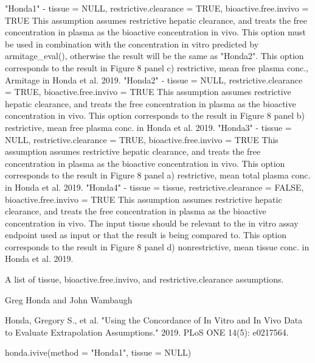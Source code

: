 \documentclass[a4paper]{book}
\begin{document}
%
\begin{Details}\relax
"Honda1" - tissue = NULL, restrictive.clearance = TRUE, bioactive.free.invivo = TRUE
This assumption assumes restrictive hepatic clearance, and treats the free concentration in plasma as 
the bioactive concentration in vivo. This option must be used in combination with the concentration in vitro 
predicted by armitage\_eval(), otherwise the result will be the same as "Honda2". This option corresponds to the result 
in Figure 8 panel c) restrictive, mean free plasma conc., Armitage in Honda et al. 2019.
"Honda2" - tissue = NULL, restrictive.clearance = TRUE, bioactive.free.invivo = TRUE
This assumption assumes restrictive hepatic clearance, and treats the free concentration in plasma as 
the bioactive concentration in vivo. This option corresponds to the result 
in Figure 8 panel b) restrictive, mean free plasma conc. in Honda et al. 2019.
"Honda3" - tissue = NULL, restrictive.clearance = TRUE, bioactive.free.invivo = TRUE
This assumption assumes restrictive hepatic clearance, and treats the free concentration in plasma as 
the bioactive concentration in vivo. This option corresponds to the result 
in Figure 8 panel a) restrictive, mean total plasma conc. in Honda et al. 2019.
"Honda4" - tissue = tissue, restrictive.clearance = FALSE, bioactive.free.invivo = TRUE
This assumption assumes restrictive hepatic clearance, and treats the free concentration in plasma as 
the bioactive concentration in vivo. The input tissue should be relevant to the in vitro assay endpoint used as input or that
the result is being compared to. This option corresponds to the result 
in Figure 8 panel d) nonrestrictive, mean tissue conc. in Honda et al. 2019.
\end{Details}
%
\begin{Value}
A list of tissue, bioactive.free.invivo, and restrictive.clearance assumptions.
\end{Value}
%
\begin{Author}\relax
Greg Honda and John Wambaugh
\end{Author}
%
\begin{References}\relax
Honda, Gregory S., et al. "Using the Concordance of In Vitro and 
In Vivo Data to Evaluate Extrapolation Assumptions." 2019. PLoS ONE 14(5): e0217564.
\end{References}
%
\begin{Examples}
\begin{ExampleCode}
honda.ivive(method = "Honda1", tissue = NULL)

\end{ExampleCode}
\end{Examples}
\end{document}
